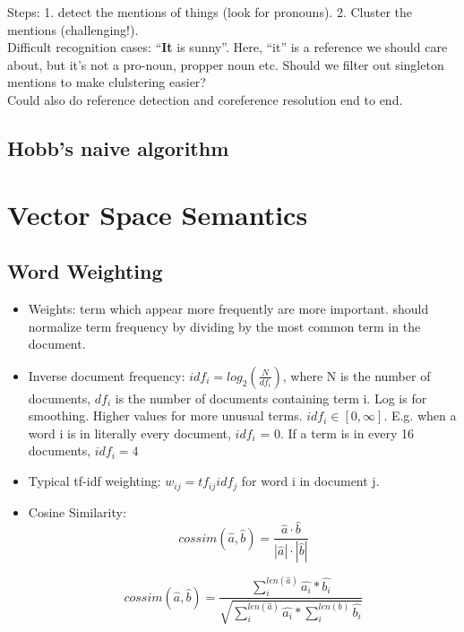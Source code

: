 \documentclass[]{article}
\begin{document}
	Steps: 1. detect the mentions of things (look for pronouns). 2. Cluster the mentions (challenging!). \\
	
	Difficult recognition cases: ``\textbf{It} is sunny''. Here, ``it'' is a reference we should care about, but it's not a pro-noun, propper noun etc. Should we filter out singleton mentions to make clulstering easier? \\
	
	Could also do reference detection and coreference resolution end to end.
	
	\subsection{Hobb's naive algorithm}
	
	\clearpage
	\section{Vector Space Semantics}
    
    \subsection{Word Weighting}
    
    \begin{itemize}
     \item Weights: term which appear more frequently  are more important. should normalize term frequency by dividing by the most common term in the document.
     \item Inverse document frequency: $idf_i = log_2(\frac{N}{df_i})$, where N is the number of documents, $df_i$ is the number of documents containing term i. Log is for smoothing. Higher values for more unusual terms. $idf_i \in [0, \infty]$. E.g. when a word i is in literally every document, $idf_i$ = 0. If a term is in every 16 documents, $idf_i = 4$
     \item Typical tf-idf weighting: $w_{ij} = tf_{ij}idf_j$ for word i in document j.
     \item Cosine Similarity: $$cossim(\hat{a}, \hat{b}) = \frac{\hat{a} \cdot \hat{b}}{|\hat{a}| \cdot |\hat{b}|}$$
     
     $$cossim(\hat{a}, \hat{b}) 
     = \frac
     {\sum_i^{len(\hat{a})} \hat{a_i} * \hat{b_i}}
     {\sqrt{\sum_i^{len(\hat{a})}\hat{a_i} * \sum_i^{len(b)}\hat{b_i}}}$$
     
    \end{itemize}
\end{document}
